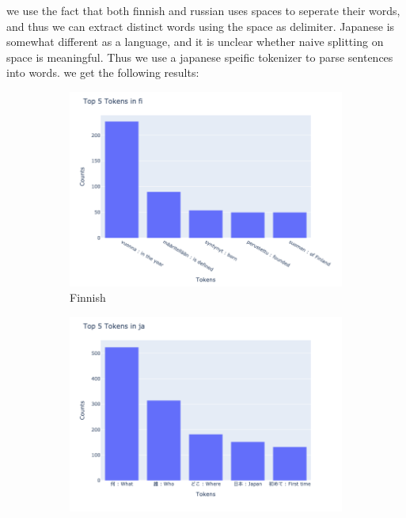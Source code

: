 \documentclass[11pt]{article}
\begin{document}
\begin{enumerate}
    we use the fact that both finnish and russian uses spaces to seperate their words, and thus we can extract distinct words using the space as delimiter.
    Japanese is somewhat different as a language, and it is unclear whether naive splitting on space is meaningful. Thus we use a japanese speific tokenizer to parse sentences into words.
    we get the following results:

    \begin{figure}[t]
        \centering
        \begin{subfigure}[b]{0.1\textwidth}
            \centering
            \includegraphics[width=\textwidth]{week1_b_top_5_tokens_fi.png}
            \caption{Finnish}
            \label{fig:top_5_tokens_fi}
        \end{subfigure}
        \hfill
        \begin{subfigure}[b]{0.1\textwidth}
            \centering
            \includegraphics[width=\textwidth]{week1_b_top_5_tokens_ja.png}

\end{subfigure}
\end{figure}
\end{enumerate}
\end{document}
